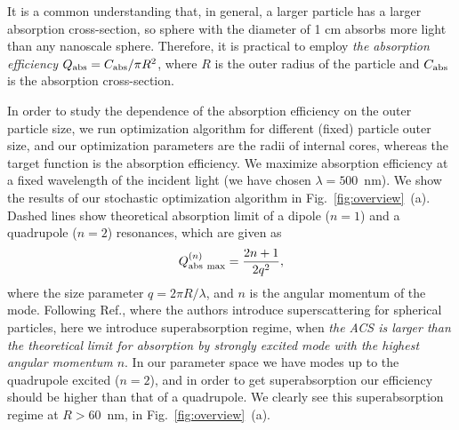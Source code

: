 \documentclass[twoside,twocolumn,9pt]{article}
\begin{document}
It is a common understanding that, in general, a larger particle has a
larger absorption cross-section, so sphere with the diameter of 1 cm
absorbs more light than any nanoscale sphere. Therefore, it is
practical to employ {\em the absorption efficiency} $Q_{\rm
  abs}=C_{\rm abs}/\pi R^2$, where $R$ is the outer radius of the
particle and $C_{\rm abs}$ is the absorption cross-section.

\begin{figure}[h]
\end{figure}
%
In order to study the dependence of the absorption efficiency on the
outer particle size, we run optimization algorithm for different
(fixed) particle outer size, and our optimization parameters are the
radii of internal cores, whereas the target function is the absorption
efficiency. We maximize absorption efficiency at a fixed wavelength of
the incident light (we have chosen $\lambda=500$~nm). We show the
results of our stochastic optimization algorithm in
Fig.~\ref{fig:overview}~(a).  Dashed lines show theoretical absorption
limit of a dipole ($n=1$) and a quadrupole ($n=2$)
resonances,\cite{Tribelsky-2011} which are given as \[Q^{(n)}_{\rm
  abs\ max}=\frac{2n+1}{2q^2},\] where the size parameter $q=2\pi
R/\lambda$, and $n$ is the angular momentum of the mode. Following
Ref.\cite{Fan-2011}, where the authors introduce superscattering for
spherical particles, here we introduce superabsorption regime, when
{\em the ACS is larger than the theoretical limit for absorption by
  strongly excited mode with the highest angular momentum $n$}. In our
parameter space we have modes up to the quadrupole excited ($n=2$),
and in order to get superabsorption our efficiency should be higher
than that of a quadrupole. We clearly see this superabsorption regime
at $R>60$~nm, in Fig.~\ref{fig:overview}~(a).
\end{document}
